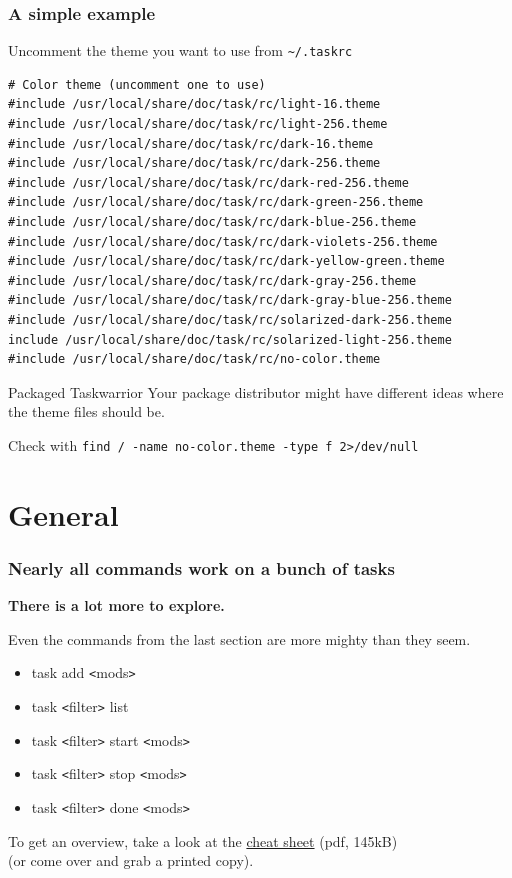 \documentclass[t]{beamer}
\begin{document}
\begin{frame}[fragile]\frametitle{A simple example}
    Uncomment the theme you want to use from \verb+~/.taskrc+
    \begin{lstlisting}
# Color theme (uncomment one to use)
#include /usr/local/share/doc/task/rc/light-16.theme
#include /usr/local/share/doc/task/rc/light-256.theme
#include /usr/local/share/doc/task/rc/dark-16.theme
#include /usr/local/share/doc/task/rc/dark-256.theme
#include /usr/local/share/doc/task/rc/dark-red-256.theme
#include /usr/local/share/doc/task/rc/dark-green-256.theme
#include /usr/local/share/doc/task/rc/dark-blue-256.theme
#include /usr/local/share/doc/task/rc/dark-violets-256.theme
#include /usr/local/share/doc/task/rc/dark-yellow-green.theme
#include /usr/local/share/doc/task/rc/dark-gray-256.theme
#include /usr/local/share/doc/task/rc/dark-gray-blue-256.theme
#include /usr/local/share/doc/task/rc/solarized-dark-256.theme
include /usr/local/share/doc/task/rc/solarized-light-256.theme
#include /usr/local/share/doc/task/rc/no-color.theme
\end{lstlisting}

    \begin{alertblock}{Packaged Taskwarrior}
        Your package distributor might have different ideas where the theme files should be.

        Check with \verb+find / -name no-color.theme -type f 2>/dev/null+
    \end{alertblock}
\end{frame}

\section{General}

\begin{frame}[fragile]\frametitle{Nearly all commands work on a bunch of tasks}
    \textbf{There is a lot more to explore.}

    Even the commands from the last section are more mighty than they seem. \pause

    \begin{itemize}
        \item task add {\tt<}mods{\tt>}
        \item task {\tt<}filter{\tt>} list
        \item task {\tt<}filter{\tt>} start {\tt<}mods{\tt>}
        \item task {\tt<}filter{\tt>} stop {\tt<}mods{\tt>}
        \item task {\tt<}filter{\tt>} done {\tt<}mods{\tt>}
    \end{itemize} \pause

    To get an overview, take a look at the \href{http://taskwarrior.org/download/task-2.5.1.ref.pdf}{cheat sheet} (pdf, 145kB) \\
    (or come over and grab a printed copy).
\end{frame}
\end{document}
